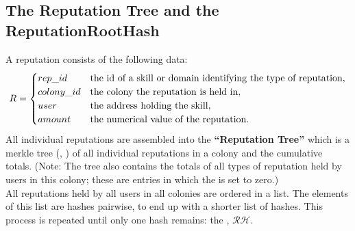 \subsection{The Reputation Tree and the ReputationRootHash}\label{sec:reptree}
A reputation consists of the following data:
$$
R = 
\begin{cases}
 rep\_id & \textnormal{the id of a skill or domain identifying the type of reputation},\\
 colony\_id & \textnormal{the colony the reputation is held in},\\
 user & \textnormal{the address holding the skill},\\
 amount & \textnormal{the numerical value of the reputation}.
\end{cases}
$$
All individual reputations are assembled into the \textbf{``Reputation Tree''} which is a merkle tree (\cite{MerkleTrees}, \cite{MerkleInEthereum}) of all individual reputations in a colony and the cumulative totals. (Note: The tree also contains the totals of all types of reputation held by users in this colony; these are entries in which the  is set to zero.)\\
All reputations held by all users in all colonies are ordered in a list. The elements of this list are hashes pairwise, to end up with a shorter list of hashes. This process is repeated until only one hash remains: the , $\mathcal{RH}$.
\begin{center}
\end{center}

